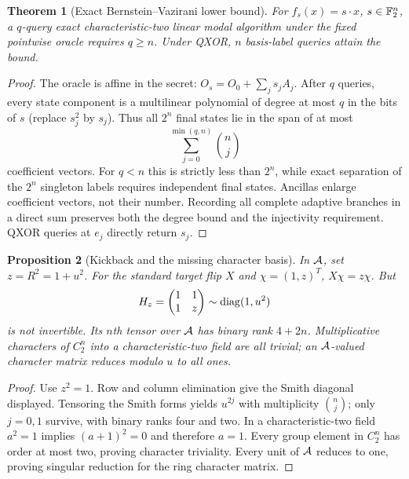 \documentclass[11pt]{article}
\newtheorem{theorem}{Theorem}[section]
\newtheorem{proposition}[theorem]{Proposition}
\theoremstyle{remark}
\begin{document}
\begin{theorem}[Exact Bernstein--Vazirani lower bound]
For $f_s(x)=s\cdot x$, $s\in\mathbb F_2^n$, a $q$-query exact characteristic-two
linear modal algorithm under the fixed pointwise oracle requires $q\geq n$.
Under QXOR, $n$ basis-label queries attain the bound.
\end{theorem}
\begin{proof}
The oracle is affine in the secret:
$O_s=O_0+\sum_j s_j A_j$. After $q$ queries, every state component is a
multilinear polynomial of degree at most $q$ in the bits of $s$ (replace
$s_j^2$ by $s_j$). Thus all $2^n$ final states lie in the span of at most
\[
 \sum_{j=0}^{\min(q,n)}\binom nj
\]
coefficient vectors. For $q<n$ this is strictly less than $2^n$, while exact
separation of the $2^n$ singleton labels requires independent final states.
Ancillas enlarge coefficient vectors, not their number. Recording all complete
adaptive branches in a direct sum preserves both the degree bound and the
injectivity requirement. QXOR queries at $e_j$ directly return $s_j$.
\end{proof}

\begin{proposition}[Kickback and the missing character basis]
In $\mathcal A$, set $z=R^2=1+u^2$. For the standard target flip $X$ and
$\chi=(1,z)^T$, $X\chi=z\chi$. But
\[
 H_z=\begin{pmatrix}1&1\\1&z\end{pmatrix}\sim\operatorname{diag}(1,u^2)
\]
is not invertible. Its $n$th tensor over $\mathcal A$ has binary rank $4+2n$.
Multiplicative characters of $C_2^n$ into a characteristic-two field are all
trivial; an $\mathcal A$-valued character matrix reduces modulo $u$ to all ones.
\end{proposition}
\begin{proof}
Use $z^2=1$. Row and column elimination give the Smith diagonal displayed.
Tensoring the Smith forms yields $u^{2j}$ with multiplicity $\binom nj$;
only $j=0,1$ survive, with binary ranks four and two. In a characteristic-two
field $a^2=1$ implies $(a+1)^2=0$ and therefore $a=1$. Every group element
in $C_2^n$ has order at most two, proving character triviality. Every unit of
$\mathcal A$ reduces to one, proving singular reduction for the ring character matrix.
\end{proof}
\end{document}
